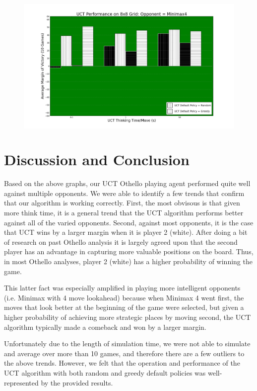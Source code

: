 \documentclass[12pt,letterpaper]{article}
\begin{document}
\begin{figure}[!h]
\begin{center}
\includegraphics[scale=.4]{88_Minimax4}
\end{center}
\end{figure}

\pagebreak
\section{Discussion and Conclusion}
\label{conc}
Based on the above graphs, our UCT Othello playing agent performed quite well against multiple opponents. We were able to identify a few trends that confirm that our algorithm is working correctly.  First, the most obvisous is that given more think time, it is a general trend that the UCT algorithm performs better against all of the varied opponents. Second, against most opponents, it is the case that UCT wins by a larger margin when it is player 2 (white). After doing a bit of research on past Othello analysis it is largely agreed upon that the second player has an advantage in capturing more valuable positions on the board. Thus, in most Othello analyses, player 2 (white) has a higher probability of winning the game. 

This latter fact was especially amplified in playing more intelligent opponents (i.e. Minimax with 4 move lookahead) because when Minimax 4 went first, the moves that look better at the beginning of the game were selected, but given a higher probability of achieving more strategic places by moving second, the UCT algorithm typically made a comeback and won by a larger margin.

Unfortunately due to the length of simulation time, we were not able to simulate and average over more than 10 games, and therefore there are a few outliers to the above trends.  However, we felt that the operation and performance of the UCT algorithm with both random and greedy default policies was well-represented by the provided results.
\end{document}
